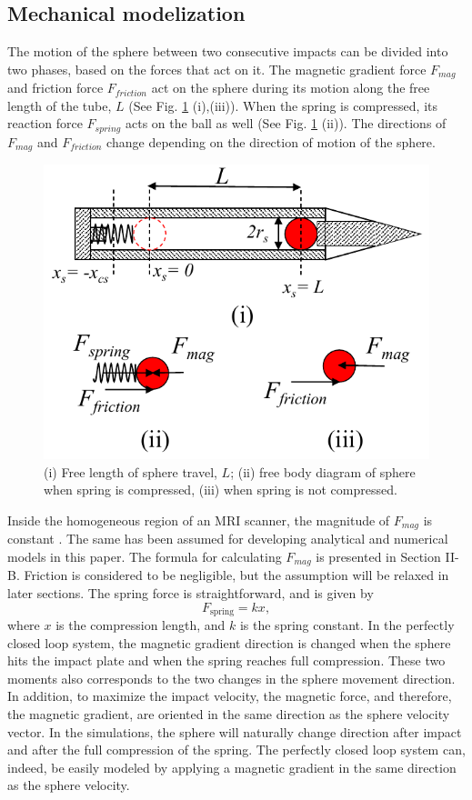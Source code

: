 \documentclass[letterpaper, 10 pt, conference]{ieeeconf}  %
\begin{document}
\subsection{Mechanical modelization}
The motion of the sphere between two consecutive impacts can be divided into two  phases, based on the forces that act on it. The magnetic gradient force $F_{mag}$ and friction force $F_{friction}$ act on the sphere during its motion along the free length of the tube, $L$ (See Fig. \ref{FBD} (i),(iii)). When the spring is compressed, its reaction force $F_{spring}$ acts on the ball as well (See Fig. \ref{FBD} (ii)). The directions of $F_{mag}$ and $F_{friction}$  change depending on the direction of motion of the sphere. 
\begin{figure}
	\includegraphics[width=\linewidth]{FBD_R1.pdf}
	\caption{(i) Free length of sphere travel, $L$; (ii) free body diagram of sphere when spring is compressed, (iii) when spring is not compressed.}
	\label{FBD}
\end{figure}
Inside the homogeneous region of an MRI scanner, the magnitude of $F_{mag}$ is constant \cite{CMR:CMR20163}. The same has been assumed for developing analytical and numerical models in this paper. The formula for calculating $F_{mag}$ is presented in Section II-B. Friction is considered to be negligible, but the assumption will be relaxed in later sections. The spring force is straightforward, and is given by
\begin{equation}
F_{\text{spring}}=k x,
\label{spring_force}
\end{equation}
where $x$ is the compression length, and $k$ is the spring constant. In the perfectly closed loop system, the magnetic gradient direction is changed when the sphere hits the impact plate and when the spring reaches full compression. These two moments also corresponds to the two changes in the sphere movement direction. In addition, to maximize the impact velocity, the magnetic force, and therefore, the magnetic gradient, are oriented in the same direction as the sphere velocity vector. In the simulations, the sphere will naturally change direction after impact and after the full compression of the spring. The perfectly closed loop system can, indeed, be easily modeled by applying a magnetic gradient in the same direction as the sphere velocity.
\end{document}
